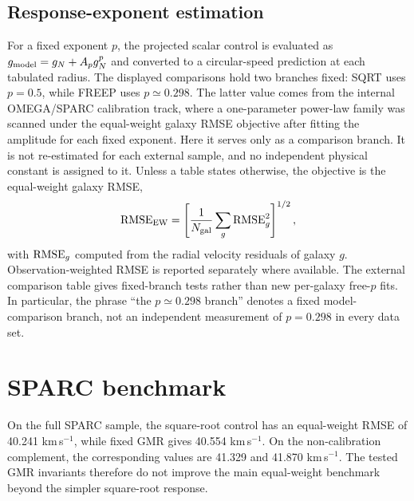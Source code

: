 ﻿\documentclass[twocolumn]{aastex631}
\newcommand{\kms}{km\,s$^{-1}$}
\begin{document}
\subsection{Response-exponent estimation}
For a fixed exponent $p$, the projected scalar control is evaluated as $g_{\rm model}=g_N+A_p g_N^p$ and converted to a circular-speed prediction at each tabulated radius.  The displayed comparisons hold two branches fixed: SQRT uses $p=0.5$, while FREEP uses $p\simeq0.298$.  The latter value comes from the internal OMEGA/SPARC calibration track, where a one-parameter power-law family was scanned under the equal-weight galaxy RMSE objective after fitting the amplitude for each fixed exponent.  Here it serves only as a comparison branch.  It is not re-estimated for each external sample, and no independent physical constant is assigned to it.  Unless a table states otherwise, the objective is the equal-weight galaxy RMSE,
\begin{equation}
{\rm RMSE}_{\rm EW}=\left[\frac{1}{N_{\rm gal}}\sum_g {\rm RMSE}_g^2\right]^{1/2},
\end{equation}
with ${\rm RMSE}_g$ computed from the radial velocity residuals of galaxy $g$.  Observation-weighted RMSE is reported separately where available.  The external comparison table gives fixed-branch tests rather than new per-galaxy free-$p$ fits.  In particular, the phrase ``the $p\simeq0.298$ branch'' denotes a fixed model-comparison branch, not an independent measurement of $p=0.298$ in every data set.

\section{SPARC benchmark}
On the full SPARC sample, the square-root control has an equal-weight RMSE of 40.241 \kms, while fixed GMR gives 40.554 \kms.  On the non-calibration complement, the corresponding values are 41.329 and 41.870 \kms.  The tested GMR invariants therefore do not improve the main equal-weight benchmark beyond the simpler square-root response.
\end{document}
